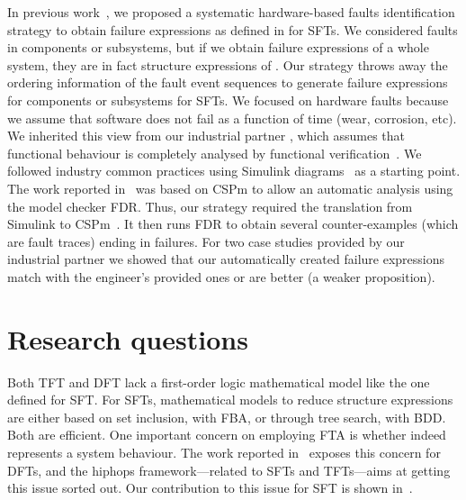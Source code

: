 \documentclass[12pt,openright,twoside,a4paper,oldfontcommands,english,brazil,final]{abntex2}
\theoremstyle{theo}
\def\embraer{%
  our industrial partner%
  \xspace%
}
\newcommand{\simulink}{Simulink\xspace}
\begin{document}
In previous work~\cite{Didier2012,DM2012}, we proposed a systematic hardware-based faults identification strategy to obtain failure expressions as defined in  for \acp{SFT}.
%
We considered faults in components or subsystems, but if we obtain failure expressions of a whole system, they are in fact structure expressions of .
%
Our strategy throws away the ordering information of the fault event sequences to generate failure expressions for components or subsystems for \acp{SFT}.
%
%
We focused on hardware faults because we assume that software does not fail as a function of time (wear, corrosion, etc).
%
We inherited this view from \embraer, which assumes that functional behaviour is completely analysed by functional verification~\cite{SP2011}.
%
We followed industry common practices using \simulink diagrams~\cite{Nise1992} as a starting point.
%
The work reported in~\cite{DM2012} was based on \ac{CSPm} to allow an automatic analysis using the model checker \acs{FDR}.
%
Thus, our strategy required the translation from \simulink to \ac{CSPm}~\cite{JMS+2011}.
%
It then runs \acs{FDR} to obtain several counter-examples (which are fault traces) ending in failures.
%
For two case studies provided by \embraer we showed that our automatically created failure expressions match with the engineer's provided ones or are better (a weaker proposition).

\section{Research questions}
\label{sec:research-questions}

Both \ac{TFT} and \ac{DFT} lack a first-order logic mathematical model like the one defined for \ac{SFT}.
For \acp{SFT}, mathematical models to reduce structure expressions are either based on set inclusion, with \ac{FBA}, or through tree search, with \ac{BDD}.
Both are efficient.
One important concern on employing \ac{FTA} is whether  indeed represents a system behaviour.
The work reported in~\cite{MCS+1999} exposes this concern for \acp{DFT}, and the \ac{hiphops} framework---related to \acp{SFT} and \acp{TFT}---aims at getting this issue sorted out.
Our contribution to this issue for \ac{SFT} is shown in~\cite{DM2012,Didier2012}.
\end{document}
